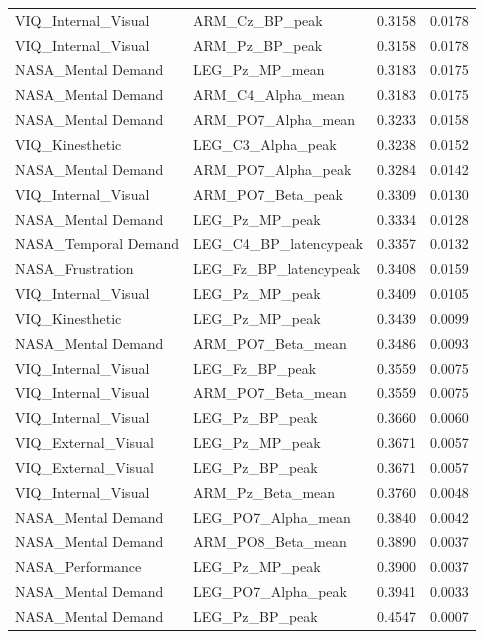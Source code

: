\documentclass[10pt,letterpaper]{article}
\begin{document}
\begin{longtable}{@{}llll@{}}
VIQ\_Internal\_Visual & ARM\_Cz\_BP\_peak & 0.3158 & 0.0178 \\
\rowcolor[HTML]{EFEFEF} 
VIQ\_Internal\_Visual & ARM\_Pz\_BP\_peak & 0.3158 & 0.0178 \\
NASA\_Mental Demand & LEG\_Pz\_MP\_mean & 0.3183 & 0.0175 \\
\rowcolor[HTML]{EFEFEF} 
NASA\_Mental Demand & ARM\_C4\_Alpha\_mean & 0.3183 & 0.0175 \\
NASA\_Mental Demand & ARM\_PO7\_Alpha\_mean & 0.3233 & 0.0158 \\
\rowcolor[HTML]{EFEFEF} 
VIQ\_Kinesthetic & LEG\_C3\_Alpha\_peak & 0.3238 & 0.0152 \\
NASA\_Mental Demand & ARM\_PO7\_Alpha\_peak & 0.3284 & 0.0142 \\
\rowcolor[HTML]{EFEFEF} 
VIQ\_Internal\_Visual & ARM\_PO7\_Beta\_peak & 0.3309 & 0.0130 \\
NASA\_Mental Demand & LEG\_Pz\_MP\_peak & 0.3334 & 0.0128 \\
\rowcolor[HTML]{EFEFEF} 
NASA\_Temporal Demand & LEG\_C4\_BP\_latencypeak & 0.3357 & 0.0132 \\
NASA\_Frustration & LEG\_Fz\_BP\_latencypeak & 0.3408 & 0.0159 \\
\rowcolor[HTML]{EFEFEF} 
VIQ\_Internal\_Visual & LEG\_Pz\_MP\_peak & 0.3409 & 0.0105 \\
VIQ\_Kinesthetic & LEG\_Pz\_MP\_peak & 0.3439 & 0.0099 \\
\rowcolor[HTML]{EFEFEF} 
NASA\_Mental Demand & ARM\_PO7\_Beta\_mean & 0.3486 & 0.0093 \\
VIQ\_Internal\_Visual & LEG\_Fz\_BP\_peak & 0.3559 & 0.0075 \\
\rowcolor[HTML]{EFEFEF} 
VIQ\_Internal\_Visual & ARM\_PO7\_Beta\_mean & 0.3559 & 0.0075 \\
VIQ\_Internal\_Visual & LEG\_Pz\_BP\_peak & 0.3660 & 0.0060 \\
\rowcolor[HTML]{EFEFEF} 
VIQ\_External\_Visual & LEG\_Pz\_MP\_peak & 0.3671 & 0.0057 \\
VIQ\_External\_Visual & LEG\_Pz\_BP\_peak & 0.3671 & 0.0057 \\
\rowcolor[HTML]{EFEFEF} 
VIQ\_Internal\_Visual & ARM\_Pz\_Beta\_mean & 0.3760 & 0.0048 \\
NASA\_Mental Demand & LEG\_PO7\_Alpha\_mean & 0.3840 & 0.0042 \\
\rowcolor[HTML]{EFEFEF} 
NASA\_Mental Demand & ARM\_PO8\_Beta\_mean & 0.3890 & 0.0037 \\
NASA\_Performance & LEG\_Pz\_MP\_peak & 0.3900 & 0.0037 \\
\rowcolor[HTML]{EFEFEF} 
NASA\_Mental Demand & LEG\_PO7\_Alpha\_peak & 0.3941 & 0.0033 \\
NASA\_Mental Demand & LEG\_Pz\_BP\_peak & 0.4547 & 0.0007 \\ \bottomrule
\end{longtable}
\end{document}
